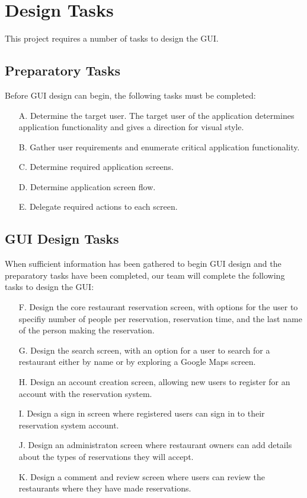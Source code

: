 \chapter{Design Tasks}

This project requires a number of tasks to design the GUI.

\section{Preparatory Tasks}
\label{sec:prep}

Before GUI design can begin, the following tasks must be completed:

\begin{itemize}
    \item [A.] \label{task:A} Determine the target user. The target user of
        the application determines application functionality and gives a
        direction for visual style.
    \item [B.] \label{task:B} Gather user requirements and enumerate critical
        application functionality.
    \item [C.] \label{task:C} Determine required application screens.
    \item [D.] \label{task:D} Determine application screen flow.
    \item [E.] \label{task:E} Delegate required actions to each screen.
\end{itemize}

\section{GUI Design Tasks}
\label{sec:gui}

When sufficient information has been gathered to begin GUI design and the
preparatory tasks have been completed, our team will complete the following
tasks to design the GUI:

\begin{itemize}
    \item [F.] \label{task:F} Design the core restaurant reservation screen, with options for the
          user to specifiy number of people per reservation, reservation
          time, and the last name of the person making the reservation.
    \item [G.] \label{task:G} Design the search screen, with an option for a user to search for
          a restaurant either by name or by exploring a Google Maps screen.
    \item [H.] \label{task:H} Design an account creation screen, allowing new users to register
          for an account with the reservation system.
    \item [I.] \label{task:I} Design a sign in screen where registered users can sign in to
          their reservation system account.
    \item [J.] \label{task:J} Design an administraton screen where restaurant owners can add
          details about the types of reservations they will accept.
    \item [K.] \label{task:K} Design a comment and review screen where users can review the
          restaurants where they have made reservations.
\end{itemize}
